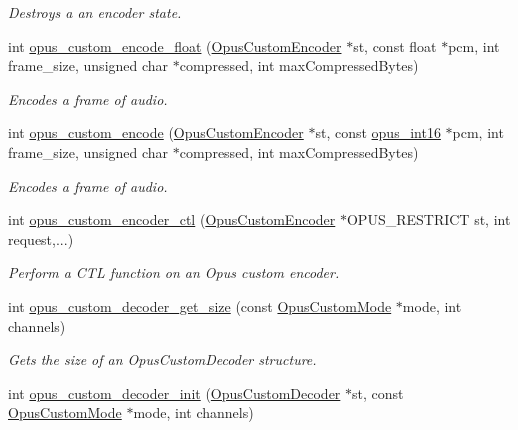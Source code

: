 \begin{DoxyCompactItemize}
\begin{DoxyCompactList}\small\item\em Destroys a an encoder state. \end{DoxyCompactList}\item 
int \hyperlink{group__opus__custom_ga9403d7a1fc09a0e49692a7f93decee21}{opus\+\_\+custom\+\_\+encode\+\_\+float} (\hyperlink{group__opus__custom_ga7abe6a7afc599667950251c987feb439}{Opus\+Custom\+Encoder} $\ast$st, const float $\ast$pcm, int frame\+\_\+size, unsigned char $\ast$compressed, int max\+Compressed\+Bytes)
\begin{DoxyCompactList}\small\item\em Encodes a frame of audio. \end{DoxyCompactList}\item 
int \hyperlink{group__opus__custom_ga21d6b0c4106ed5777a8632eed97d4cdc}{opus\+\_\+custom\+\_\+encode} (\hyperlink{group__opus__custom_ga7abe6a7afc599667950251c987feb439}{Opus\+Custom\+Encoder} $\ast$st, const \hyperlink{opus__types_8h_acc9ed7cf60479eb81f9648c6ec27dc26}{opus\+\_\+int16} $\ast$pcm, int frame\+\_\+size, unsigned char $\ast$compressed, int max\+Compressed\+Bytes)
\begin{DoxyCompactList}\small\item\em Encodes a frame of audio. \end{DoxyCompactList}\item 
int \hyperlink{group__opus__custom_gacf3d854e681cae3b693ee56b54459226}{opus\+\_\+custom\+\_\+encoder\+\_\+ctl} (\hyperlink{group__opus__custom_ga7abe6a7afc599667950251c987feb439}{Opus\+Custom\+Encoder} $\ast$O\+P\+U\+S\+\_\+\+R\+E\+S\+T\+R\+I\+CT st, int request,...)
\begin{DoxyCompactList}\small\item\em Perform a C\+TL function on an Opus custom encoder. \end{DoxyCompactList}\item 
int \hyperlink{group__opus__custom_gabe5d6f5f85dcad3ce8b88fe4b2642d2b}{opus\+\_\+custom\+\_\+decoder\+\_\+get\+\_\+size} (const \hyperlink{group__opus__custom_gaf33847c711195b9edef896b73c96ec4f}{Opus\+Custom\+Mode} $\ast$mode, int channels)
\begin{DoxyCompactList}\small\item\em Gets the size of an Opus\+Custom\+Decoder structure. \end{DoxyCompactList}\item 
int \hyperlink{group__opus__custom_gad4cb362035313c8f77c24cd29dd0932b}{opus\+\_\+custom\+\_\+decoder\+\_\+init} (\hyperlink{group__opus__custom_gacae60f89c5ce7aeea69503451b9e2e6f}{Opus\+Custom\+Decoder} $\ast$st, const \hyperlink{group__opus__custom_gaf33847c711195b9edef896b73c96ec4f}{Opus\+Custom\+Mode} $\ast$mode, int channels)

\end{DoxyCompactItemize}
